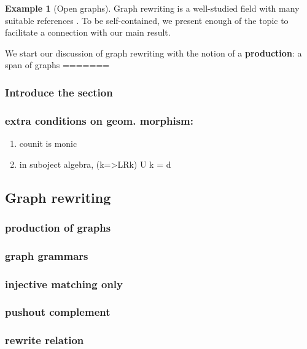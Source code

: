 \documentclass{amsart}
\newcommand{\defn}[1]{\textbf{#1}}
\theoremstyle{remark}
\theoremstyle{definition}
\newtheorem{example}[theorem]{Example}
\begin{document}
\begin{example}[Open graphs]
Graph rewriting is a well-studied field with many suitable references
\cite{Ehrig_GraphGram,DblPushoutRevis}. To be self-contained, we
present enough of the topic to facilitate a connection with our main
result.

We start our discussion of graph rewriting with the notion of a
\defn{production}: a span of graphs
=======
\label{sec-3}

\subsubsection{Introduce the section}
\label{sec-3-1}

\subsubsection{extra conditions on geom. morphism:}
\label{sec-3-1-1}
\begin{enumerate}
\item counit is monic
\label{sec-3-1-1-1}
\item in suboject algebra, (k=>LRk) U k = d
\label{sec-3-1-1-2}
\end{enumerate}


\subsection{Graph rewriting}
\label{sec-3-2}

\subsubsection{production of graphs}
\label{sec-3-2-1}
\subsubsection{graph grammars}
\label{sec-3-2-2}
\subsubsection{injective matching only}
\label{sec-3-2-3}
\subsubsection{pushout complement}
\label{sec-3-2-4}
\subsubsection{rewrite relation}
\label{sec-3-2-5}

\end{example}
\end{document}
